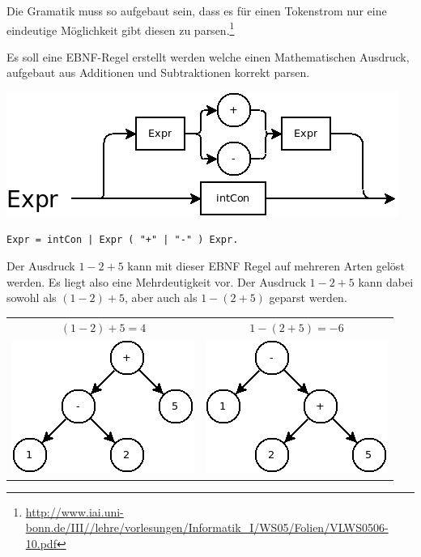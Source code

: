 Die Gramatik muss so aufgebaut sein, dass es für einen Tokenstrom nur eine eindeutige Möglichkeit gibt diesen zu parsen.\footnote{\url{http://www.iai.uni-bonn.de/III//lehre/vorlesungen/Informatik_I/WS05/Folien/VLWS0506-10.pdf}}


Es soll eine EBNF-Regel erstellt werden welche einen Mathematischen Ausdruck, aufgebaut aus Additionen und Subtraktionen korrekt parsen.

\includegraphics[scale=0.5]{./media/images/compiler/ambiguity_wrong.png}

\begin{lstlisting}[language=EBNF]
Expr = intCon | Expr ( "+" | "-" ) Expr.
\end{lstlisting}

Der Ausdruck $1-2+5$ kann mit dieser EBNF Regel auf mehreren Arten gelöst werden. Es liegt also eine Mehrdeutigkeit vor. Der Ausdruck $1-2+5$ kann dabei sowohl als $(1-2)+5$, aber auch als $1-(2+5)$ geparst werden.

\begin{tabular}{ c | c }
  $(1-2)+5=4$ & 
  $1-(2+5)=-6$ \\
  \includegraphics[scale=0.5]{./media/images/compiler/ambiguity_tree_correct.png} & 
  \includegraphics[scale=0.5]{./media/images/compiler/ambiguity_tree_wrong.png} \\
\end{tabular}

